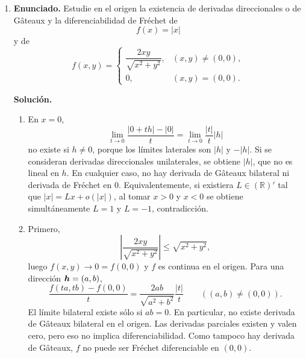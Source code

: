 \documentclass[11pt]{article}
\newcommand{\abs}[1]{\left|#1\right|}
\def\vec   #1{\mbox{\boldmath $#1$}{}}
\def\R{\mathbb R}
\begin{document}
\begin{enumerate}[label=\textbf{\arabic*.}, leftmargin=*]
    \item \textbf{Enunciado.} Estudie en el origen la existencia de derivadas direccionales o de Gâteaux y la diferenciabilidad de Fréchet de
    \[
        f(x)=|x|
    \]
    y de
    \[
        f(x,y)=
        \begin{cases}
        \dfrac{2xy}{\sqrt{x^2+y^2}}, &(x,y)\neq(0,0),\\[0.8ex]
        0,&(x,y)=(0,0).
        \end{cases}
    \]

    \textbf{Solución.}
    \begin{enumerate}[label=(\alph*)]
        \item En $x=0$,
        \[
            \lim_{t\to0}\frac{|0+th|-|0|}{t}
            =
            \lim_{t\to0}\frac{|t|}{t}|h|
        \]
        no existe si $h\neq0$, porque los límites laterales son $|h|$ y $-|h|$. Si se consideran derivadas direccionales unilaterales, se obtiene $|h|$, que no es lineal en $h$. En cualquier caso, no hay derivada de Gâteaux bilateral ni derivada de Fréchet en $0$. Equivalentemente, si existiera $L\in(\R)'$ tal que $|x|=Lx+o(|x|)$, al tomar $x>0$ y $x<0$ se obtiene simultáneamente $L=1$ y $L=-1$, contradicción.

        \item Primero,
        \[
            \abs{\frac{2xy}{\sqrt{x^2+y^2}}}
            \le
            \sqrt{x^2+y^2},
        \]
        luego $f(x,y)\to0=f(0,0)$ y $f$ es continua en el origen. Para una dirección $\vec h=(a,b)$,
        \[
            \frac{f(t a,t b)-f(0,0)}{t}
            =
            \frac{2ab}{\sqrt{a^2+b^2}}\frac{|t|}{t}
            \qquad ((a,b)\neq(0,0)).
        \]
        El límite bilateral existe sólo si $ab=0$. En particular, no existe derivada de Gâteaux bilateral en el origen. Las derivadas parciales existen y valen cero, pero eso no implica diferenciabilidad. Como tampoco hay derivada de Gâteaux, $f$ no puede ser Fréchet diferenciable en $(0,0)$.
    \end{enumerate}

\end{enumerate}
\end{document}
